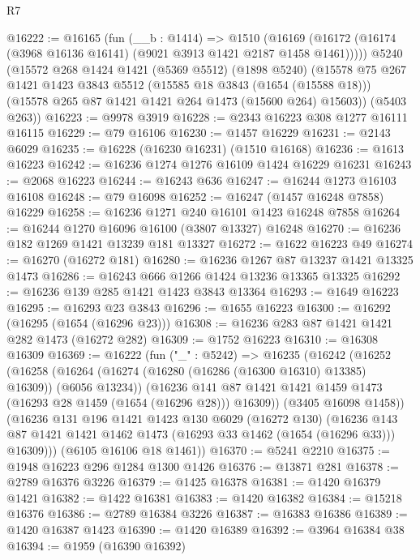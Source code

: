 \begin{lexlean}{R7}
\begin{coremodule}
@16222 := @16165
    (fun (__b : @1414) =>
    @1510 (@16169 (@16172 (@16174 (@3968 @16136 @16141) (@9021 @3913 @1421 @2187 @1458 @1461)))))
    @5240
    (@15572
      @268
      @1424
      @1421
      (@5369 @5512)
      (@1898 @5240)
      (@15578
        @75
        @267
        @1421
        @1423
        @3843
        @5512
        (@15585 @18 @3843 (@1654 (@15588 @18)))
        (@15578 @265 @87 @1421 @1421 @264 @1473 (@15600 @264) @15603))
      (@5403 @263))
@16223 := @9978 @3919
@16228 := @2343 @16223 @308 @1277 @16111 @16115
@16229 := @79 @16106
@16230 := @1457 @16229
@16231 := @2143 @6029
@16235 := @16228 (@16230 @16231) (@1510 @16168)
@16236 := @1613 @16223
@16242 := @16236 @1274 @1276 @16109 @1424 @16229 @16231
@16243 := @2068 @16223
@16244 := @16243 @636
@16247 := @16244 @1273 @16103 @16108
@16248 := @79 @16098
@16252 := @16247 (@1457 @16248 @7858) @16229
@16258 := @16236 @1271 @240 @16101 @1423 @16248 @7858
@16264 := @16244 @1270 @16096 @16100 (@3807 @13327) @16248
@16270 := @16236 @182 @1269 @1421 @13239 @181 @13327
@16272 := @1622 @16223 @49
@16274 := @16270 (@16272 @181)
@16280 := @16236 @1267 @87 @13237 @1421 @13325 @1473
@16286 := @16243 @666 @1266 @1424 @13236 @13365 @13325
@16292 := @16236 @139 @285 @1421 @1423 @3843 @13364
@16293 := @1649 @16223
@16295 := @16293 @23 @3843
@16296 := @1655 @16223
@16300 := @16292 (@16295 (@1654 (@16296 @23)))
@16308 := @16236 @283 @87 @1421 @1421 @282 @1473 (@16272 @282)
@16309 := @1752 @16223
@16310 := @16308 @16309
@16369 := @16222
    (fun ("_" : @5242) =>
    @16235
      (@16242
        (@16252
          (@16258
            (@16264 (@16274 (@16280 (@16286 (@16300 @16310) @13385) @16309)) (@6056 @13234))
            (@16236
              @141
              @87
              @1421
              @1421
              @1459
              @1473
              (@16293 @28 @1459 (@1654 (@16296 @28)))
              @16309))
          (@3405 @16098 @1458))
        (@16236
          @131
          @196
          @1421
          @1423
          @130
          @6029
          (@16272 @130)
          (@16236 @143 @87 @1421 @1421 @1462 @1473 (@16293 @33 @1462 (@1654 (@16296 @33))) @16309)))
      (@6105 @16106 @18 @1461))
@16370 := @5241 @2210
@16375 := @1948 @16223 @296 @1284 @1300 @1426
@16376 := @13871 @281
@16378 := @2789 @16376 @3226
@16379 := @1425 @16378
@16381 := @1420 @16379 @1421
@16382 := @1422 @16381
@16383 := @1420 @16382
@16384 := @15218 @16376
@16386 := @2789 @16384 @3226
@16387 := @16383 @16386
@16389 := @1420 @16387 @1423
@16390 := @1420 @16389
@16392 := @3964 @16384 @38
@16394 := @1959 (@16390 @16392)

\end{coremodule}
\end{lexlean}
